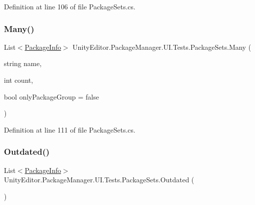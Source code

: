Definition at line 106 of file Package\+Sets.\+cs.

\mbox{\label{class_unity_editor_1_1_package_manager_1_1_u_i_1_1_tests_1_1_package_sets_a29c323e3040bc3e0d70b26f76d72a50c}} 
\subsubsection{\texorpdfstring{Many()}{Many()}\hspace{0.1cm}{\footnotesize\ttfamily [2/2]}}
{\footnotesize\ttfamily List$<$\mbox{\hyperlink{class_unity_editor_1_1_package_manager_1_1_u_i_1_1_package_info}{Package\+Info}}$>$ Unity\+Editor.\+Package\+Manager.\+U\+I.\+Tests.\+Package\+Sets.\+Many (\begin{DoxyParamCaption}\item[{string}]{name,  }\item[{int}]{count,  }\item[{bool}]{only\+Package\+Group = {\ttfamily false} }\end{DoxyParamCaption})}



Definition at line 111 of file Package\+Sets.\+cs.

\mbox{\label{class_unity_editor_1_1_package_manager_1_1_u_i_1_1_tests_1_1_package_sets_a726ae3618e67b2bda58f75ac7e6e38e2}} 
\subsubsection{\texorpdfstring{Outdated()}{Outdated()}}
{\footnotesize\ttfamily List$<$\mbox{\hyperlink{class_unity_editor_1_1_package_manager_1_1_u_i_1_1_package_info}{Package\+Info}}$>$ Unity\+Editor.\+Package\+Manager.\+U\+I.\+Tests.\+Package\+Sets.\+Outdated (\begin{DoxyParamCaption}{ }\end{DoxyParamCaption})}



